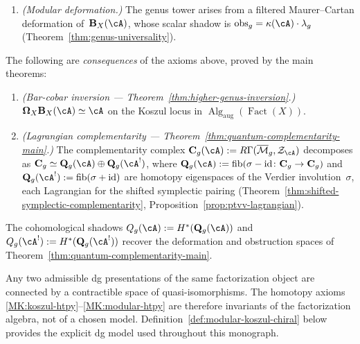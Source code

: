\begin{definition}
\begin{enumerate}[label=\textup{(MK\arabic*$_\infty$)}]
\item\label{MK:modular-htpy}
\emph{(Modular deformation.)}
The genus tower arises from a filtered Maurer--Cartan deformation
of~$\mathbf{B}_X(\cA)$, whose scalar shadow is
$\mathrm{obs}_g = \kappa(\cA) \cdot \lambda_g$
\textup{(}Theorem~\textup{\ref{thm:genus-universality})}.
\end{enumerate}

\noindent The following are \emph{consequences} of the axioms above,
proved by the main theorems:
\begin{enumerate}[label=\textup{(MK\arabic*$_\infty$)},start=4]
\item\label{MK:inversion-htpy}
\emph{(Bar-cobar inversion --- Theorem~\textup{\ref{thm:higher-genus-inversion}}.)}
$\boldsymbol{\Omega}_X \mathbf{B}_X(\cA) \simeq \cA$
on the Koszul locus in
$\operatorname{Alg}_{\mathrm{aug}}(\operatorname{Fact}(X))$.

\item\label{MK:complementarity-htpy}
\emph{(Lagrangian complementarity --- Theorem~\textup{\ref{thm:quantum-complementarity-main}}.)}
The complementarity complex
$\mathbf{C}_g(\cA) := R\Gamma(\overline{\mathcal{M}}_g, \mathcal{Z}_{\cA})$
decomposes as
$\mathbf{C}_g \simeq \mathbf{Q}_g(\cA) \oplus \mathbf{Q}_g(\cA^!)$,
where $\mathbf{Q}_g(\cA) := \operatorname{fib}(\sigma - \mathrm{id}
\colon \mathbf{C}_g \to \mathbf{C}_g)$ and
$\mathbf{Q}_g(\cA^!) := \operatorname{fib}(\sigma + \mathrm{id})$
are homotopy eigenspaces of the Verdier involution~$\sigma$, each
Lagrangian for the shifted symplectic pairing
\textup{(}Theorem~\textup{\ref{thm:shifted-symplectic-complementarity},}
Proposition~\textup{\ref{prop:ptvv-lagrangian})}.
\end{enumerate}
The cohomological shadows
$Q_g(\cA) := H^*(\mathbf{Q}_g(\cA))$ and
$Q_g(\cA^!) := H^*(\mathbf{Q}_g(\cA^!))$ recover the
deformation and obstruction spaces of
Theorem~\ref{thm:quantum-complementarity-main}.
\end{definition}

\begin{remark}\label{rem:model-independence}
Any two admissible dg presentations of the same factorization
object are connected by a contractible space of quasi-isomorphisms.
The homotopy axioms \ref{MK:koszul-htpy}--\ref{MK:modular-htpy}
are therefore invariants of the factorization algebra, not of a
chosen model.  Definition~\ref{def:modular-koszul-chiral} below provides
the explicit dg model used throughout this monograph.
\end{remark}

